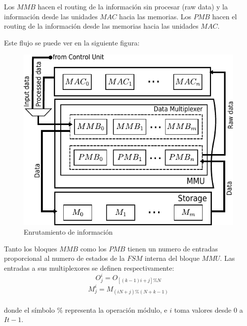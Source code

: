 Los $MMB$ hacen el routing de la información sin procesar (raw data) y la información desde las unidades $MAC$ hacia las memorias.
Los $PMB$ hacen el routing de la información desde las memorias hacia las unidades $MAC$.\\
\bigskip

Este flujo se puede ver en la siguiente figura:
\begin{figure}
\centering
\includegraphics[scale=0.9]{muxes}
\caption{ Enrutamiento de información}
\label{mmu_routing}
\end{figure}
Tanto los bloques $MMB$ como los $PMB$ tienen un numero de entradas proporcional al numero de estados de la $FSM$ interna del bloque $MMU$. 
Las entradas a sus multiplexores se definen respectivamente:
\begin{equation}%
  O_j^i = O_{[(k-1)i+j]\%N}
\end{equation}
\begin{equation}%
  M_j^i = M_{(iN+j)\%(N+k-1)}
\end{equation}
\\
donde el símbolo $ \% $ representa la operación módulo, e $i$ toma valores desde $0$ a $It-1$.

